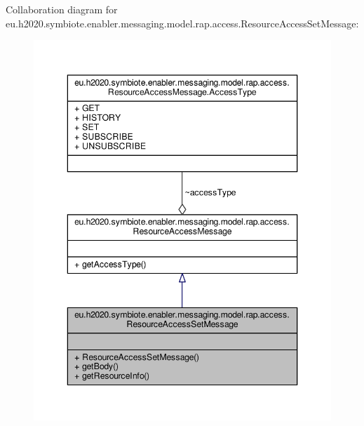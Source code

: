 Collaboration diagram for eu.\+h2020.\+symbiote.\+enabler.\+messaging.\+model.\+rap.\+access.\+Resource\+Access\+Set\+Message\+:
\nopagebreak
\begin{figure}[H]
\begin{center}
\leavevmode
\includegraphics[width=346pt]{classeu_1_1h2020_1_1symbiote_1_1enabler_1_1messaging_1_1model_1_1rap_1_1access_1_1ResourceAccessSetMessage__coll__graph}
\end{center}
\end{figure}

